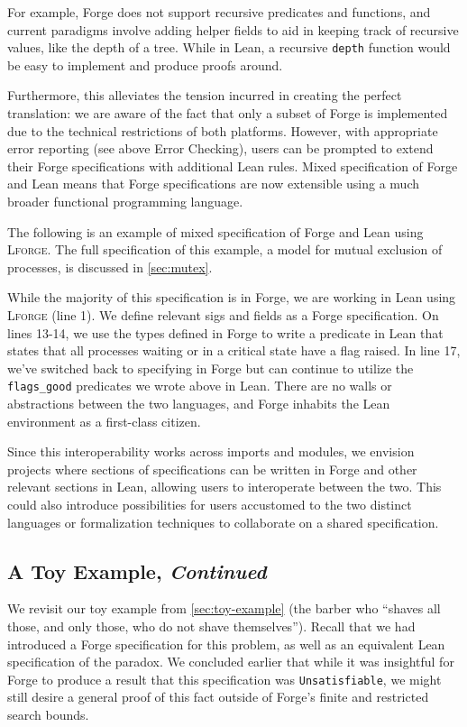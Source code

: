 For example, Forge does not support recursive predicates and functions, and current paradigms involve adding helper fields to aid in keeping track of recursive values, like the depth of a tree. While in Lean, a recursive \texttt{depth} function would be easy to implement and produce proofs around. 

Furthermore, this alleviates the tension incurred in creating the perfect translation: we are aware of the fact that only a subset of Forge is implemented due to the technical restrictions of both platforms. However, with appropriate error reporting (see above Error Checking), users can be prompted to extend their Forge specifications with additional Lean rules. Mixed specification of Forge and Lean means that Forge specifications are now extensible using a much broader functional programming language. 

The following is an example of mixed specification of Forge and Lean using \textsc{Lforge}. The full specification of this example, a model for mutual exclusion of processes, is discussed in \cref{sec:mutex}. 



While the majority of this specification is in Forge, we are working in Lean using \textsc{Lforge} (line 1). We define relevant sigs and fields as a Forge specification. On lines 13-14, we use the types defined in Forge to write a predicate in Lean that states that all processes waiting or in a critical state have a flag raised. In line 17, we've switched back to specifying in Forge but can continue to utilize the \texttt{flags\_good} predicates we wrote above in Lean. There are no walls or abstractions between the two languages, and Forge inhabits the Lean environment as a first-class citizen. 

Since this interoperability works across imports and modules, we envision projects where sections of specifications can be written in Forge and other relevant sections in Lean, allowing users to interoperate between the two. This could also introduce possibilities for users accustomed to the two distinct languages or formalization techniques to collaborate on a shared specification. 

\subsection{A Toy Example, \emph{Continued}}\label{sec:toy-example-continued}

We revisit our toy example from \cref{sec:toy-example} (the barber who ``shaves all those, and only those, who do not shave themselves''). Recall that we had introduced a Forge specification for this problem, as well as an equivalent Lean specification of the paradox. We concluded earlier that while it was insightful for Forge to produce a result that this specification was \texttt{Unsatisfiable}, we might still desire a general proof of this fact outside of Forge's finite and restricted search bounds. 

